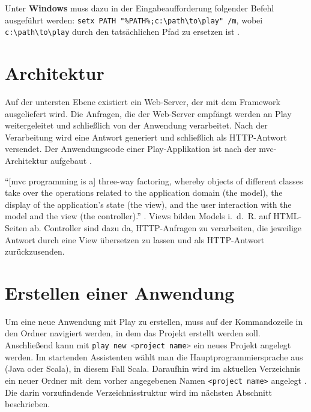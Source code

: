Unter \textbf{Windows} muss dazu in der Eingabeaufforderung folgender Befehl ausgeführt werden: \lstinline|setx PATH "%PATH%;c:\path\to\play" /m|, wobei \lstinline|c:\path\to\play| durch den tatsächlichen Pfad zu ersetzen ist \cite[vgl.][S.~9]{play_for_scala_v8}.



\section{Architektur} %
\label{sec:architektur}

Auf der untersten Ebene existiert ein Web-Server, der mit dem Framework ausgeliefert wird.
Die Anfragen, die der Web-Server empfängt werden an Play weitergeleitet und schließlich von der Anwendung verarbeitet.
Nach der Verarbeitung wird eine Antwort generiert und schließlich als HTTP-Antwort versendet.
Der Anwendungscode einer Play-Applikation ist nach der \gls{mvc}-Architektur aufgebaut \cite[vgl.][S.~51-53]{play_for_scala_v8}.

"`[\gls{mvc} programming is a] three-way factoring, whereby objects of different classes take over the operations related to the application domain (the model), the display of the application's state (the view), and the user interaction with the model and the view (the controller)."' \cite[vgl.][S.~1]{mvc}.
Views bilden Models i.~d.~R. auf HTML-Seiten ab.
Controller sind dazu da, HTTP-Anfragen zu verarbeiten, die jeweilige Antwort durch eine View übersetzen zu lassen und als HTTP-Antwort zurückzusenden.





\section{Erstellen einer Anwendung} %
\label{sec:erstellen_einer_anwendung}

Um eine neue Anwendung mit Play zu erstellen, muss auf der Kommandozeile in den Ordner navigiert werden, in dem das Projekt erstellt werden soll.
Anschließend kann mit \lstinline[language=sh]|play new <project name>| ein neues Projekt angelegt werden.
Im startenden Assistenten wählt man die Hauptprogrammiersprache aus (Java oder Scala), in diesem Fall Scala.
Daraufhin wird im aktuellen Verzeichnis ein neuer Ordner mit dem vorher angegebenen Namen \lstinline|<project name>| angelegt \cite[vgl.][S.~10]{play_for_scala_v8}.
Die darin vorzufindende Verzeichnisstruktur wird im nächsten Abschnitt beschrieben.

